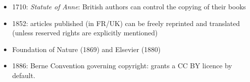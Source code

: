 \documentclass[10pt,compress,serif,aspectratio=169]{beamer}
\begin{document}
\begin{frame}[t]%
 \vskip1cm%
\begin{itemize}

 \item 1710: \textit{Statute of Anne}: British authors can control the copying of their books 
 \item 1852: articles published (in FR/UK) can be freely reprinted and translated (unless reserved rights are explicitly mentioned)
 \item Foundation of Nature (1869) and Elsevier (1880)
 \item 1886: Berne Convention governing copyright: grants a CC BY licence by default.%


\end{itemize}
\end{frame}
\end{document}
